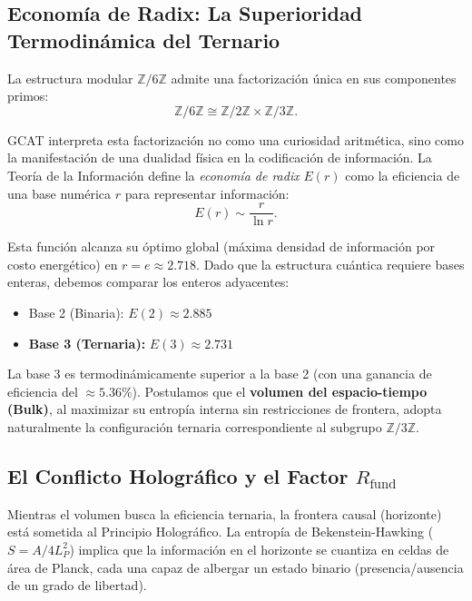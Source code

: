 \documentclass[12pt, a4paper]{article}
\theoremstyle{plain}
\theoremstyle{definition}
\begin{document}
\subsection{Economía de Radix: La Superioridad Termodinámica del Ternario}

La estructura modular $\mathbb{Z}/6\mathbb{Z}$ admite una factorización única en sus componentes primos:
\begin{equation}
\mathbb{Z}/6\mathbb{Z} \cong \mathbb{Z}/2\mathbb{Z} \times \mathbb{Z}/3\mathbb{Z}.
\label{eq:factorization}
\end{equation}

GCAT interpreta esta factorización no como una curiosidad aritmética, sino como la manifestación de una dualidad física en la codificación de información. La Teoría de la Información define la \textit{economía de radix} $E(r)$ como la eficiencia de una base numérica $r$ para representar información:
\begin{equation}
E(r) \sim \frac{r}{\ln r}.
\end{equation}

Esta función alcanza su óptimo global (máxima densidad de información por costo energético) en $r = e \approx 2.718$. Dado que la estructura cuántica requiere bases enteras, debemos comparar los enteros adyacentes:
\begin{itemize}
    \item Base 2 (Binaria): $E(2) \approx 2.885$
    \item \textbf{Base 3 (Ternaria):} $E(3) \approx 2.731$
\end{itemize}

La base 3 es termodinámicamente superior a la base 2 (con una ganancia de eficiencia del $\approx 5.36\%$). Postulamos que el \textbf{volumen del espacio-tiempo (Bulk)}, al maximizar su entropía interna sin restricciones de frontera, adopta naturalmente la configuración ternaria correspondiente al subgrupo $\mathbb{Z}/3\mathbb{Z}$.

\subsection{El Conflicto Holográfico y el Factor $R_{\text{fund}}$}

Mientras el volumen busca la eficiencia ternaria, la frontera causal (horizonte) está sometida al Principio Holográfico. La entropía de Bekenstein-Hawking ($S = A/4L_P^2$) implica que la información en el horizonte se cuantiza en celdas de área de Planck, cada una capaz de albergar un estado binario (presencia/ausencia de un grado de libertad).
\end{document}
